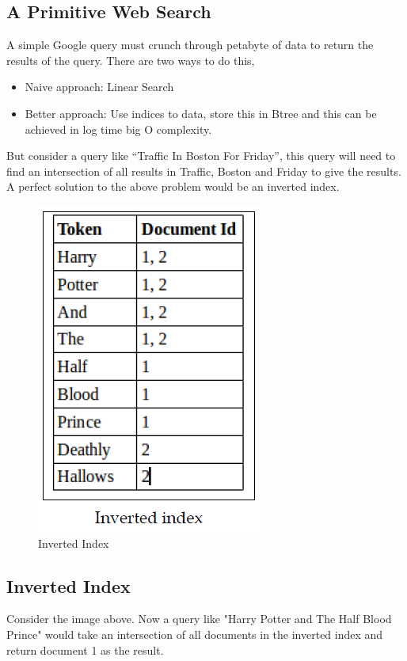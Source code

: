 \documentclass[twoside]{article}
\begin{document}
\subsection{A Primitive Web Search}
A simple Google query must crunch through petabyte of data to return the results of the query. There are two ways to do this,

\begin{itemize}
    \item Naive approach: Linear Search
    \item Better approach: Use indices to data, store this in Btree and this can be achieved in log time big O complexity.
\end{itemize}

But consider a query like ``Traffic In Boston For Friday'', this query will need to find an intersection of all results in Traffic, Boston and Friday to give the results. A perfect solution to the above problem would be an inverted index. 

\begin{figure}[h]
    \centering
  \includegraphics[scale=0.7]{images/iGri3.png}
  \caption{Inverted Index}
\end{figure}

\subsection{Inverted Index}
Consider the image above. Now a query like "Harry Potter and The Half Blood Prince" would take an intersection of all documents in the inverted index and return document 1 as the result.
\end{document}
